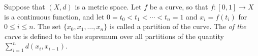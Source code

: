 \documentclass[12pt]{article}
\begin{document}
Suppose that $(X,d)$ is a metric space. Let $f$ be a curve, so that
$f: [0,1] \to X$ is a continuous function, and let $0=t_0 < t_1 < \cdots < t_n=1$ and
$x_i = f(t_i)$ for $0 \le i \le n$. 
The set $\{x_0, x_1, \ldots , x_n\}$
is called a partition of the curve. 
The \emph{ of the curve} is defined to be 
the supremum over all partitions of the quantity $\sum_{i=1}^n d(x_i , x_{i-1})$.


\end{document}
